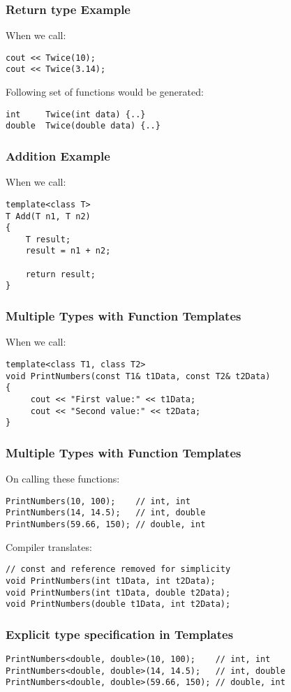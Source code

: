 \documentclass{beamer}
\newtheorem{Key points}{Key points}
\begin{document}
\begin{frame}[fragile]
\frametitle{Return type Example}
When we call:
\begin{lstlisting}
cout << Twice(10);
cout << Twice(3.14);
\end{lstlisting}

Following set of functions would be generated:

\begin{lstlisting}
int     Twice(int data) {..}
double  Twice(double data) {..}
\end{lstlisting}
\end{frame}
\begin{frame}[fragile]
\frametitle{Addition Example}
When we call:
\begin{lstlisting}
template<class T>
T Add(T n1, T n2)
{
    T result;
    result = n1 + n2;
    
    return result;
}
\end{lstlisting}
\end{frame}

\begin{frame}[fragile]
\frametitle{Multiple Types with Function Templates}
When we call:
\begin{lstlisting}
template<class T1, class T2>
void PrintNumbers(const T1& t1Data, const T2& t2Data)
{
     cout << "First value:" << t1Data;
     cout << "Second value:" << t2Data;
}
\end{lstlisting}
\end{frame}

\begin{frame}
\frametitle{Multiple Types with Function Templates}
On calling these functions:
\begin{lstlisting}
PrintNumbers(10, 100);    // int, int
PrintNumbers(14, 14.5);   // int, double
PrintNumbers(59.66, 150); // double, int
\end{lstlisting}
Compiler translates:
\begin{lstlisting}
// const and reference removed for simplicity
void PrintNumbers(int t1Data, int t2Data);
void PrintNumbers(int t1Data, double t2Data);
void PrintNumbers(double t1Data, int t2Data);
\end{lstlisting}
\end{frame}
\begin{frame}[fragile]
\frametitle{Explicit type specification in Templates}
\begin{lstlisting}
PrintNumbers<double, double>(10, 100);    // int, int
PrintNumbers<double, double>(14, 14.5);   // int, double
PrintNumbers<double, double>(59.66, 150); // double, int
\end{lstlisting}
\end{frame}
\end{document}
